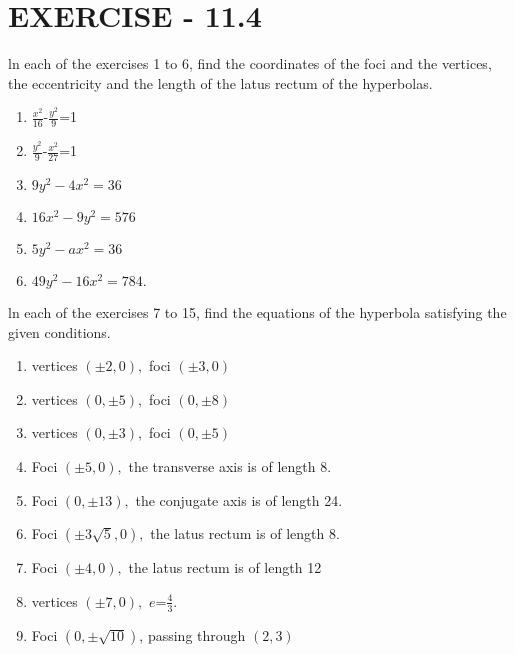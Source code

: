 \documentclass[12pt]{article}
\begin{document}
\section*{EXERCISE - 11.4}
ln each of the exercises 1 to 6, find the coordinates of the foci and the vertices, the eccentricity and the length of the latus rectum  of the hyperbolas.
\begin{enumerate}
\item $\frac{x^2}{16}$-$\frac{y^2}{9}$=1
\item $\frac{y^2}{9}$-$\frac{x^2}{27}$=1
\item $9y^2-4x^2=36$
\item $16x^2-9y^2=576$
\item $5y^2-ax^2=36$
\item $49y^2-16x^2=784.$
\end{enumerate}
ln each of the exercises 7 to 15, find the equations of the  hyperbola satisfying the given conditions.
\begin{enumerate}[resume]
\item vertices $(\pm2,0),$ foci $(\pm3,0)$
\item vertices $(0,\pm5),$ foci $(0,\pm8)$
\item vertices $(0,\pm3),$ foci $(0,\pm5)$
\item Foci $(\pm5,0),$ the transverse axis is of length 8.
\item Foci $(0,\pm13),$ the conjugate axis is of length 24.
\item Foci $(\pm3\sqrt{5},0),$ the latus rectum is of length 8.
\item Foci $(\pm4,0),$ the latus rectum is of length 12
\item vertices $(\pm7,0),$ $e$=$\frac{4}{3}.$
\item Foci $(0,\pm\sqrt{10})$, passing through $(2,3)$
\end{enumerate}
\end{document}
